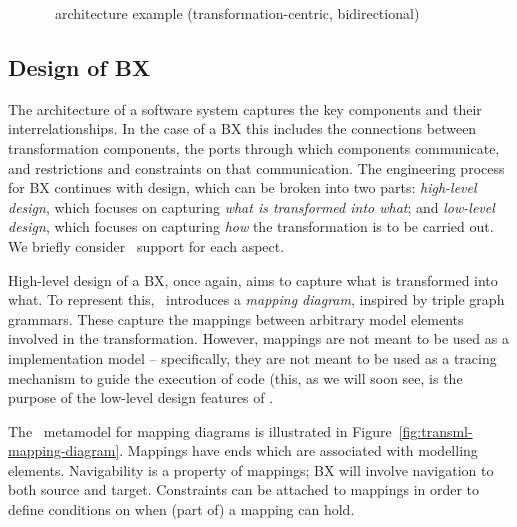 \begin{figure}[htbp]
\caption{\transml\ architecture example (transformation-centric, bidirectional)}
\label{fig:architecture-example3}
\end{figure}

\subsection{Design of BX}
The architecture of a software system captures the key components and their interrelationships. In the case of a BX this includes the connections between transformation components, the ports through which components communicate, and restrictions and constraints on that communication. The engineering process for BX continues with design, which can be broken into two parts: \textit{high-level design}, which focuses on capturing \textit{what is transformed into what}; and \textit{low-level design}, which focuses on capturing \textit{how} the transformation is to be carried out. We briefly consider \transml\ support for each aspect.

High-level design of a BX, once again, aims to capture what is transformed into what. To represent this, \transml\ introduces a \textit{mapping diagram}, inspired by triple graph grammars. These capture the mappings between arbitrary model elements involved in the transformation. However, mappings are not meant to be used as a implementation model -- specifically, they are not meant to be used as a tracing mechanism to guide the execution of code (this, as we will soon see, is the purpose of the low-level design features of \transml\).

The \transml\ metamodel for mapping diagrams is illustrated in Figure~\ref{fig:transml-mapping-diagram}. Mappings have ends which are associated with modelling elements. Navigability is a property of mappings; BX will involve navigation to both source and target. Constraints can be attached to mappings in order to define conditions on when (part of) a mapping can hold. 

